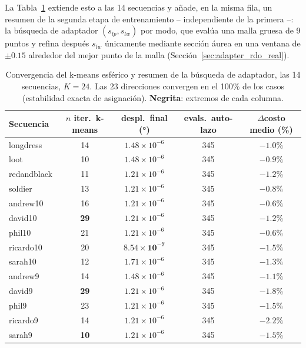        La Tabla~\ref{tab:e10_convergence} extiende esto a las 14 secuencias y añade, en la misma
        fila, un resumen de la segunda etapa de entrenamiento -- independiente de la primera --:
        la búsqueda de adaptador $(s_{lp}, s_{lw})$ por modo, que evalúa una malla gruesa de 9
        puntos y refina después $s_{lw}$ únicamente mediante sección áurea en una ventana de
        $\pm0.15$ alrededor del mejor punto de la malla (Sección~\ref{sec:adapter_rdo_real}).

        \begin{table}[H]
            \centering
            \caption{Convergencia del k-means esférico y resumen de la búsqueda de adaptador,
            las 14 secuencias, $K=24$. Las 23 direcciones convergen en el 100\% de los casos
            (estabilidad exacta de asignación). \textbf{Negrita}: extremos de cada columna.}
            \footnotesize
            \begin{tabular}{l|c|c|c|c}
                \hline
                \textbf{Secuencia} & \textbf{$n$ iter.\ k-means} & \textbf{despl.\ final (°)} &
                \textbf{evals.\ auto-lazo} & \textbf{$\Delta$costo medio (\%)} \\
                \hline
                longdress    & 14 & $1.48\times10^{-6}$ & 345 & $-1.0\%$ \\
                loot         & 10 & $1.48\times10^{-6}$ & 345 & $-0.9\%$ \\
                redandblack  & 11 & $1.21\times10^{-6}$ & 345 & $-1.2\%$ \\
                soldier      & 13 & $1.21\times10^{-6}$ & 345 & $-0.8\%$ \\
                andrew10     & 16 & $1.21\times10^{-6}$ & 345 & $\mathbf{-0.6\%}$ \\
                david10      & \textbf{29} & $1.21\times10^{-6}$ & 345 & $-1.2\%$ \\
                phil10       & 21 & $1.21\times10^{-6}$ & 345 & $\mathbf{-0.6\%}$ \\
                ricardo10    & 20 & $\mathbf{8.54\times10^{-7}}$ & 345 & $-1.5\%$ \\
                sarah10      & 12 & $1.71\times10^{-6}$ & 345 & $-1.3\%$ \\
                andrew9      & 14 & $1.48\times10^{-6}$ & 345 & $-1.1\%$ \\
                david9       & \textbf{29} & $1.21\times10^{-6}$ & 345 & $-1.8\%$ \\
                phil9        & 23 & $1.21\times10^{-6}$ & 345 & $-1.5\%$ \\
                ricardo9     & 14 & $1.21\times10^{-6}$ & 345 & $\mathbf{-2.2\%}$ \\
                sarah9       & \textbf{10} & $1.21\times10^{-6}$ & 345 & $-1.5\%$ \\
                \hline
            \end{tabular}
            \label{tab:e10_convergence}
        \end{table}


